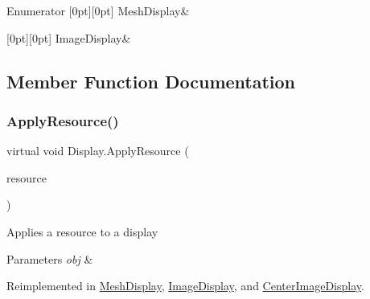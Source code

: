 \begin{DoxyEnumFields}{Enumerator}
[0pt][0pt]{}\mbox{\label{class_display_a7f7abc559192ef7e8f4a03382d3492d7a6465642df623349960f917dcf68ba989}} 
Mesh\+Display&\\
\hline

[0pt][0pt]{}\mbox{\label{class_display_a7f7abc559192ef7e8f4a03382d3492d7a6790a36b5a0528029d4ed43891266fcb}} 
Image\+Display&\\
\hline

\end{DoxyEnumFields}


\subsection{Member Function Documentation}
\mbox{\label{class_display_a811157ddb42ae4d72f690457a08711d3}} 
\subsubsection{\texorpdfstring{Apply\+Resource()}{ApplyResource()}}
{\footnotesize\ttfamily virtual void Display.\+Apply\+Resource (\begin{DoxyParamCaption}\item[{\mbox{\hyperlink{class_base_display_resource}{Base\+Display\+Resource}}}]{resource }\end{DoxyParamCaption})\hspace{0.3cm}{\ttfamily [virtual]}}



Applies a resource to a display 


\begin{DoxyParams}{Parameters}
{\em obj} & \\
\hline
\end{DoxyParams}


Reimplemented in \mbox{\hyperlink{class_mesh_display_ab9a24f407a8ff995658097a98242095e}{Mesh\+Display}}, \mbox{\hyperlink{class_image_display_ab4cae8c66db7e7d77ab117fe24e63980}{Image\+Display}}, and \mbox{\hyperlink{class_center_image_display_a140b8b82522c1aedb473b3cd532dcd34}{Center\+Image\+Display}}.

